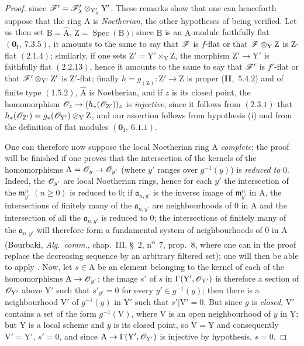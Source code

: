 \begin{proof}
since $\mathscr{F}'=\mathscr{F}'_\lambda\otimes_{\mathrm{Y}'_\lambda}\mathrm{Y}'$. These remarks show that one can henceforth suppose that
the ring $\mathrm{A}$ is \emph{Noetherian}, the other hypotheses of  being verified. Let us then set
$\mathrm{B}=\hat{\mathrm{A}}$, $\mathrm{Z}=\operatorname{Spec}(\mathrm{B})$; since $\mathrm{B}$ is an $\mathrm{A}$-module faithfully flat $(\mathbf{0}_\mathrm{I},~7.3.5)$, it amounts
to the same to say that $\mathscr{F}$ is $f$-flat or that $\mathscr{F}\otimes_\mathrm{Y}\mathrm{Z}$ is $\mathrm{Z}$-flat $(2.1.4)$; similarly, if one
sets $\mathrm{Z}'=\mathrm{Y}'\times_\mathrm{Y}\mathrm{Z}$, the morphism $\mathrm{Z}'\to\mathrm{Y}'$ is faithfully flat $(2.2.13)$, hence
it amounts to the same to say that $\mathscr{F}'$ is $f'$-flat or that $\mathscr{F}'\otimes_{\mathrm{Y}'}\mathrm{Z}'$ is $\mathrm{Z}'$-flat; finally $h=g_{(\mathrm{Z})}:\mathrm{Z}'\to\mathrm{Z}$
is proper (\textbf{II},~$5.4.2$) and of finite type $(1.5.2)$, $\hat{\mathrm{A}}$ is Noetherian, and if $z$ is its
closed point, the homomorphism $\mathscr{O}_z\to(h_*(\mathscr{O}_{\mathrm{Z}'}))_z$ is \emph{injective}, since it follows from $(2.3.1)$ that
$h_*(\mathscr{O}_{\mathrm{Z}'})=g_*(\mathscr{O}_{\mathrm{Y}'})\otimes_\mathrm{Y}\mathrm{Z}$, and our assertion follows from hypothesis (i) and from the definition of
flat modules $(\mathbf{0}_\mathrm{I},~6.1.1)$.

One can therefore now suppose the local Noetherian ring $\mathrm{A}$ \emph{complete}; the proof
will be finished if one proves that the intersection of the kernels of the homomorphisms
$\mathrm{A}=\mathscr{O}_y\to\mathscr{O}_{y'}$ (where $y'$ ranges over $g^{-1}(y)$) is \emph{reduced to} $0$. Indeed, the $\mathscr{O}_{y'}$ are local
Noetherian rings, hence for each $y'$ the intersection of the $\mathfrak{m}_{y'}^n$ $(n\geq 0)$ is reduced to $0$;
if $\mathfrak{a}_{n,y'}$ is the inverse image of $\mathfrak{m}_{y'}^n$ in $\mathrm{A}$, the intersections of finitely many of the $\mathfrak{a}_{n,y'}$ are
neighbourhoods of $0$ in $\mathrm{A}$ and the intersection of all the $\mathfrak{a}_{n,y'}$ is reduced to $0$; the intersections
of finitely many of the $\mathfrak{a}_{n,y'}$ will therefore form a fundamental system of neighbourhoods of $0$ in $\mathrm{A}$
(Bourbaki, \emph{Alg.\ comm.}, chap.~III, \S~2, n\textsuperscript{o}~7, prop.~8, where one can in the proof
replace the decreasing sequence by an arbitrary filtered set); one will then be able to
apply . Now, let $s\in\mathrm{A}$ be an element belonging to the kernel of each of
the homomorphisms $\mathrm{A}\to\mathscr{O}_{y'}$; the image $s'$ of $s$ in $\Gamma(\mathrm{Y}',\mathscr{O}_{\mathrm{Y}'})$ is therefore a section
of $\mathscr{O}_{\mathrm{Y}'}$ above $\mathrm{Y}'$ such that $s'_{y'}=0$ for every $y'\in g^{-1}(y)$; then there is a neighbourhood $\mathrm{V}'$
of $g^{-1}(y)$ in $\mathrm{Y}'$ such that $s'|\mathrm{V}'=0$. But since $g$ is \emph{closed}, $\mathrm{V}'$ contains a set
of the form $g^{-1}(\mathrm{V})$, where $\mathrm{V}$ is an open neighbourhood of $y$ in $\mathrm{Y}$; but $\mathrm{Y}$ is a local scheme
and $y$ is its closed point, so $\mathrm{V}=\mathrm{Y}$ and consequently $\mathrm{V}'=\mathrm{Y}'$,
$s'=0$, and since $\mathrm{A}\to\Gamma(\mathrm{Y}',\mathscr{O}_{\mathrm{Y}'})$ is injective by hypothesis, $s=0$.
\end{proof}

